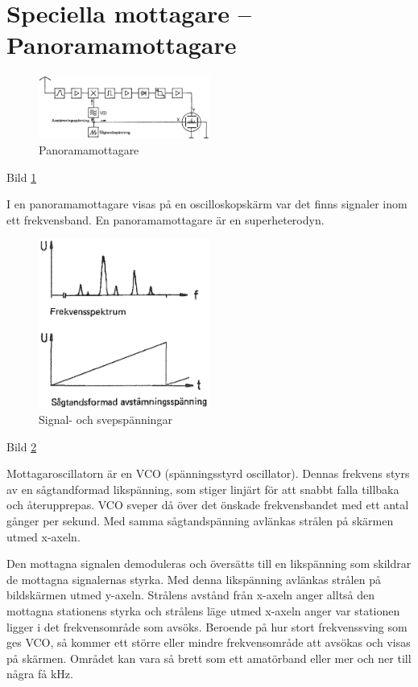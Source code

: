 \section{Speciella mottagare -- Panoramamottagare}

\begin{figure}
  \includegraphics[width=0.5\textwidth]{images/cropped_pdfs/bild_2_4-15.pdf}
  \caption{Panoramamottagare}
  \label{fig:bildII4-15}
\end{figure}

Bild \ref{fig:bildII4-15}

I en panoramamottagare visas på en oscilloskopskärm var det finns
signaler inom ett frekvensband. En panoramamottagare är en
superheterodyn.

\begin{figure}
  \includegraphics[width=0.5\textwidth]{images/cropped_pdfs/bild_2_4-17.pdf}
  \caption{Signal- och svepspänningar}
  \label{fig:bildII4-17}
\end{figure}

Bild \ref{fig:bildII4-17}

Mottagaroscillatorn är en VCO (spänningsstyrd oscillator). Dennas
frekvens styrs av en sågtandformad likspänning, som stiger linjärt för
att snabbt falla tillbaka och återupprepas. VCO sveper då över det
önskade frekvensbandet med ett antal gånger per sekund. Med
samma sågtandspänning avlänkas strålen på skärmen utmed x-axeln.

Den mottagna signalen demoduleras och översätts till en likspänning
som skildrar de mottagna signalernas styrka. Med denna likspänning
avlänkas strålen på bildskärmen utmed y-axeln. Strålens avstånd från
x-axeln anger alltså den mottagna stationens styrka och strålens läge
utmed x-axeln anger var stationen ligger i det frekvensområde som
avsöks. Beroende på hur stort frekvenssving som ges VCO, så kommer ett
större eller mindre frekvensområde att avsökas och visas på
skärmen. Området kan vara så brett som ett amatörband eller mer och
ner till några få kHz.

